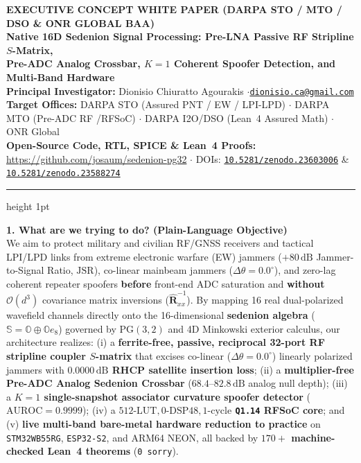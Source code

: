 \documentclass[10pt,a4paper]{article}
\newcommand{\Oc}{\mathbb{O}}
\newcommand{\Se}{\mathbb{S}}
\newcommand{\PG}{\mathrm{PG}}
\begin{document}
\begin{center}
{\large\textbf{EXECUTIVE CONCEPT WHITE PAPER (DARPA STO / MTO / DSO \& ONR GLOBAL BAA)}}\\[0.25em]
{\Large\textbf{Native 16D Sedenion Signal Processing: Pre-LNA Passive RF Stripline $S$-Matrix,\\Pre-ADC Analog Crossbar, $K=1$ Coherent Spoofer Detection, and Multi-Band Hardware}}\\[0.35em]
\textbf{Principal Investigator:} Dionisio Chiuratto Agourakis \quad$\cdot$\quad \href{mailto:dionisio.ca@gmail.com}{\texttt{dionisio.ca@gmail.com}}\\
\textbf{Target Offices:} DARPA STO (Assured PNT / EW / LPI-LPD) $\cdot$ DARPA MTO (Pre-ADC RF /RFSoC) $\cdot$ DARPA I2O/DSO (Lean~4 Assured Math) $\cdot$ ONR Global\\
\textbf{Open-Source Code, RTL, SPICE \& Lean~4 Proofs:} \url{https://github.com/josaum/sedenion-pg32} $\cdot$ DOIs: \href{https://doi.org/10.5281/zenodo.23603006}{\texttt{10.5281/zenodo.23603006}} \& \href{https://doi.org/10.5281/zenodo.23588274}{\texttt{10.5281/zenodo.23588274}}
\end{center}
\vspace{-0.45em}
\hrule height 1pt
\vspace{0.35em}

\textbf{1. What are we trying to do? (Plain-Language Objective)}\\
We aim to protect military and civilian RF/GNSS receivers and tactical LPI/LPD links from extreme electronic warfare (EW) jammers ($+80\,\mathrm{dB}$ Jammer-to-Signal Ratio, $\mathrm{JSR}$), co-linear mainbeam jammers ($\Delta\theta = 0.0^\circ$), and zero-lag coherent repeater spoofers \textbf{before} front-end ADC saturation and \textbf{without} $\mathcal{O}(d^3)$ covariance matrix inversions ($\hat{\bm{R}}_{xx}^{-1}$). By mapping 16 real dual-polarized wavefield channels directly onto the 16-dimensional \textbf{sedenion algebra} ($\Se = \Oc \oplus \Oc e_8$) governed by $\PG(3,2)$ and 4D Minkowski exterior calculus, our architecture realizes: (i) a \textbf{ferrite-free, passive, reciprocal 32-port RF stripline coupler $S$-matrix} that excises co-linear ($\Delta\theta = 0.0^\circ$) linearly polarized jammers with \textbf{$0.0000\,\mathrm{dB}$ RHCP satellite insertion loss}; (ii) a \textbf{multiplier-free Pre-ADC Analog Sedenion Crossbar} ($68.4\text{--}82.8\,\mathrm{dB}$ analog null depth); (iii) a \textbf{$K=1$ single-snapshot associator curvature spoofer detector} ($\mathrm{AUROC}=0.9999$); (iv) a \textbf{$512\text{-LUT}, 0\text{-DSP48}, 1\text{-cycle}$ \texttt{Q1.14} RFSoC core}; and (v) \textbf{live multi-band bare-metal hardware reduction to practice} on \texttt{STM32WB55RG}, \texttt{ESP32-S2}, and ARM64 NEON, all backed by \textbf{$170+$ machine-checked Lean~4 theorems} (\texttt{0 sorry}).
\end{document}
